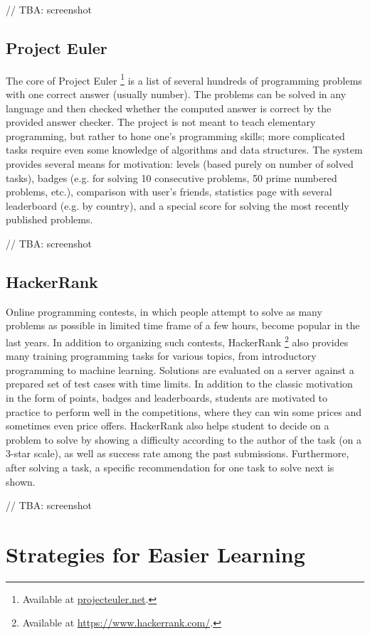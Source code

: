 \documentclass[
    digital,
    color,
    11pt,
    nocover,
    table,  %
    nolof,  %
    nolot,  %
    microtype,
]{fithesis3}
\begin{document}
// TBA: screenshot


\subsection{Project Euler}
\label{sec:project-euler}
The core of Project Euler%
\footnote{Available at \url{projecteuler.net}.}
is a list of several hundreds of programming problems with one correct answer (usually number).
The problems can be solved in any language
and then checked whether the computed answer is correct by the provided answer checker.
The project is not meant to teach elementary programming,
but rather to hone one’s programming skills;
more complicated tasks require even some knowledge of algorithms and data structures.
The system provides several means for motivation:
levels (based purely on number of solved tasks), badges
(e.g. for solving 10 consecutive problems, 50 prime numbered problems, etc.),
comparison with user’s friends,
statistics page with several leaderboard (e.g. by country),
and a special score for solving the most recently published problems.

// TBA: screenshot


\subsection{HackerRank}
\label{sec:hacker-rank}

Online programming contests,
in which people attempt to solve as many problems as possible
in limited time frame of a few hours,
become popular in the last years.
In addition to organizing such contests,
HackerRank%
\footnote{Available at \url{https://www.hackerrank.com/}.}
also provides many training programming tasks for various topics,
from introductory programming to machine learning.
Solutions are evaluated on a server against a prepared set of test cases with time limits.
In addition to the classic motivation in the form of points, badges and leaderboards, students are motivated to practice to perform well in the competitions,
where they can win some prices and sometimes even price offers.
HackerRank also helps student to decide on a problem to solve by showing a difficulty according to the author of the task (on a 3-star scale),
as well as success rate among the past submissions.
Furthermore, after solving a task,
a specific recommendation for one task to solve next is shown.

// TBA: screenshot


\section{Strategies for Easier Learning}
\label{sec:strategies-for-easier-learning}
\end{document}
